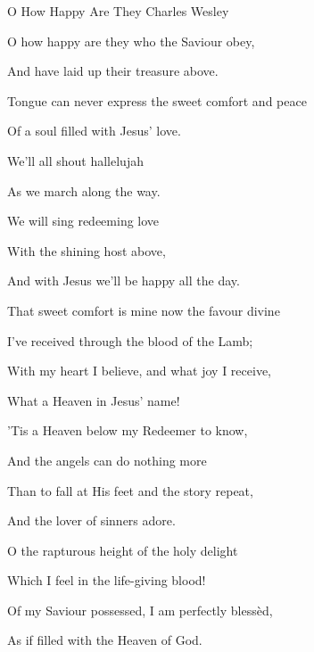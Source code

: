 \documentclass[12pt]{book}
\begin{document}
\begin{song}{O How Happy Are They}{}
  {\SBPubDom}
  {Charles Wesley}
  {}
  {}

  \begin{SBVerse}
    O how happy are they who the Saviour obey,

    And have laid up their treasure above.

    Tongue can never express the sweet comfort and peace

    Of a soul filled with Jesus' love.
  \end{SBVerse}

  \begin{SBOpGroup}
    We'll all shout hallelujah

    As we march along the way.

    We will sing redeeming love

    With the shining host above,

    And with Jesus we'll be happy all the day.
  \end{SBOpGroup}

  \begin{SBVerse}
    That sweet comfort is mine now the favour divine

    I've received through the blood of the Lamb;

    With my heart I believe, and what joy I receive,

    What a Heaven in Jesus' name!
  \end{SBVerse}

  \begin{SBVerse}
    'Tis a Heaven below my Redeemer to know,

    And the angels can do nothing more

    Than to fall at His feet and the story repeat,

    And the lover of sinners adore.
  \end{SBVerse}

  \begin{SBVerse}
    O the rapturous height of the holy delight

    Which I feel in the life-giving blood!

    Of my Saviour possessed, I am perfectly bless\`ed,

    As if filled with the Heaven of God.
  \end{SBVerse}
\end{song}
\end{document}
